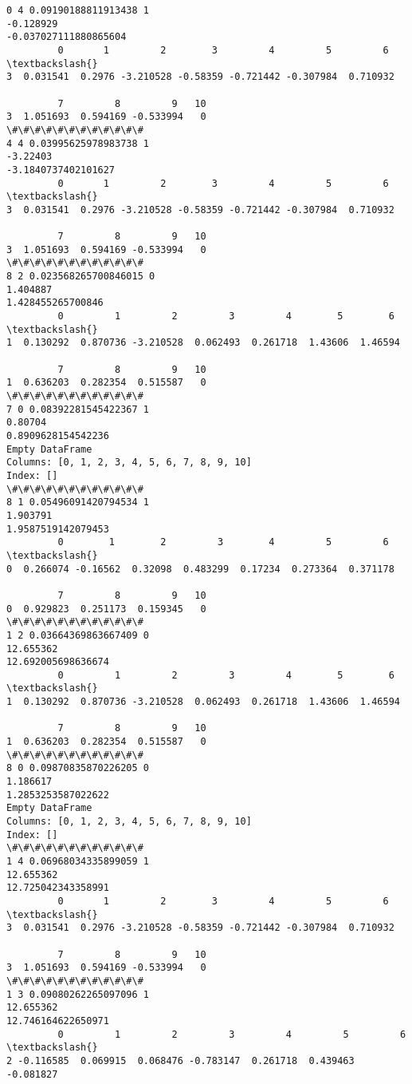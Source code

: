 \documentclass[11pt]{article}
\begin{document}
    \begin{Verbatim}[commandchars=\\\{\}]
0 4 0.09190188811913438 1
-0.128929
-0.037027111880865604
         0       1         2        3         4         5         6   \textbackslash{}
3  0.031541  0.2976 -3.210528 -0.58359 -0.721442 -0.307984  0.710932   

         7         8         9   10  
3  1.051693  0.594169 -0.533994   0  
\#\#\#\#\#\#\#\#\#\#\#\#
4 4 0.03995625978983738 1
-3.22403
-3.1840737402101627
         0       1         2        3         4         5         6   \textbackslash{}
3  0.031541  0.2976 -3.210528 -0.58359 -0.721442 -0.307984  0.710932   

         7         8         9   10  
3  1.051693  0.594169 -0.533994   0  
\#\#\#\#\#\#\#\#\#\#\#\#
8 2 0.023568265700846015 0
1.404887
1.428455265700846
         0         1         2         3         4        5        6   \textbackslash{}
1  0.130292  0.870736 -3.210528  0.062493  0.261718  1.43606  1.46594   

         7         8         9   10  
1  0.636203  0.282354  0.515587   0  
\#\#\#\#\#\#\#\#\#\#\#\#
7 0 0.08392281545422367 1
0.80704
0.8909628154542236
Empty DataFrame
Columns: [0, 1, 2, 3, 4, 5, 6, 7, 8, 9, 10]
Index: []
\#\#\#\#\#\#\#\#\#\#\#\#
8 1 0.05496091420794534 1
1.903791
1.9587519142079453
         0        1        2         3        4         5         6   \textbackslash{}
0  0.266074 -0.16562  0.32098  0.483299  0.17234  0.273364  0.371178   

         7         8         9   10  
0  0.929823  0.251173  0.159345   0  
\#\#\#\#\#\#\#\#\#\#\#\#
1 2 0.03664369863667409 0
12.655362
12.692005698636674
         0         1         2         3         4        5        6   \textbackslash{}
1  0.130292  0.870736 -3.210528  0.062493  0.261718  1.43606  1.46594   

         7         8         9   10  
1  0.636203  0.282354  0.515587   0  
\#\#\#\#\#\#\#\#\#\#\#\#
8 0 0.09870835870226205 0
1.186617
1.2853253587022622
Empty DataFrame
Columns: [0, 1, 2, 3, 4, 5, 6, 7, 8, 9, 10]
Index: []
\#\#\#\#\#\#\#\#\#\#\#\#
1 4 0.06968034335899059 1
12.655362
12.725042343358991
         0       1         2        3         4         5         6   \textbackslash{}
3  0.031541  0.2976 -3.210528 -0.58359 -0.721442 -0.307984  0.710932   

         7         8         9   10  
3  1.051693  0.594169 -0.533994   0  
\#\#\#\#\#\#\#\#\#\#\#\#
1 3 0.09080262265097096 1
12.655362
12.746164622650971
         0         1         2         3         4         5         6   \textbackslash{}
2 -0.116585  0.069915  0.068476 -0.783147  0.261718  0.439463 -0.081827   


\end{Verbatim}
\end{document}
